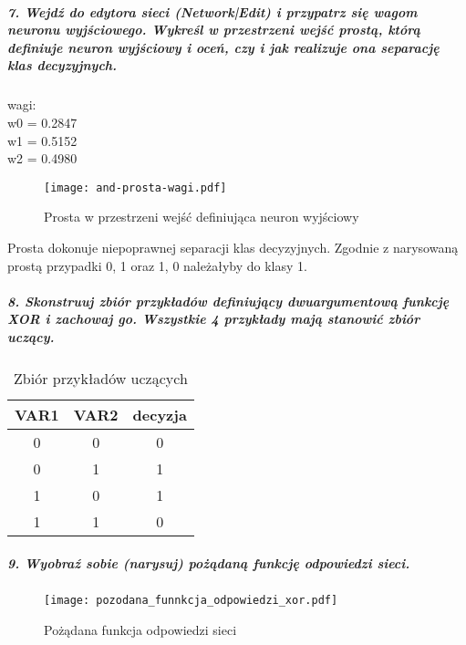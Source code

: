 \documentclass{article}
\begin{document}
\subparagraph{7. Wejdź do edytora sieci (Network|Edit) i przypatrz się wagom neuronu wyjściowego. Wykreśl w przestrzeni wejść prostą, którą definiuje neuron wyjściowy i oceń, czy i jak realizuje ona separację klas decyzyjnych. \\}
wagi: \\
w0 = 0.2847 \\
w1 = 0.5152 \\
w2 = 0.4980 \\

\begin{figure}[H]
\begin{center}
\texttt{[image: and-prosta-wagi.pdf]}
\end{center}
\caption{Prosta w przestrzeni wejść definiująca neuron wyjściowy}
\label{fig-1Tdelta}
\end{figure}

Prosta dokonuje niepoprawnej separacji klas decyzyjnych. Zgodnie z narysowaną prostą przypadki 0, 1 oraz 1, 0 należałyby do klasy 1.


\subparagraph{8. Skonstruuj zbiór przykładów definiujący dwuargumentową funkcję XOR i zachowaj go. Wszystkie 4 przykłady mają stanowić zbiór uczący. \\}

\begin{table}[h]
    \begin{tabular}{|c|c|c|}
     \hline
     	VAR1 & VAR2 & decyzja \\ \hline
        0 & 0 & 0 \\ 
        0 & 1 & 1 \\ 
		1 & 0 & 1 \\ 
		1 & 1 & 0 \\ \hline             
    \end{tabular}
    \caption{Zbiór przykładów uczących}
\end{table} 



\subparagraph{9. Wyobraź sobie (narysuj) pożądaną funkcję odpowiedzi sieci.\\}

\begin{figure}[H]
\begin{center}
\texttt{[image: pozodana\_funnkcja\_odpowiedzi\_xor.pdf]}
\end{center}
\caption{Pożądana funkcja odpowiedzi sieci}
\label{fig-1Tdelta}
\end{figure}
\end{document}
